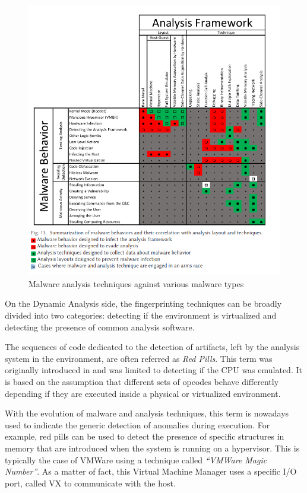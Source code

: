 \noindent
\begin{figure}[htp]
\centering
\includegraphics[width=\linewidth]{images/mal-fram.png}
\caption{Malware analysis techniques against various malware types}
\label{fig:mfrm}
\end{figure}

On the Dynamic Analysis side, the fingerprinting techniques can be broadly divided into two categories: detecting if the environment is virtualized and detecting the presence of common analysis software. 

The sequences of code dedicated to the detection of artifacts, left by the analysis system in the environment, are often referred as \textit{Red Pills}. This term was originally introduced in \cite{bruschi} and was limited to detecting if the CPU was emulated. It is based on the assumption that different sets of opcodes behave differently depending if they are executed inside a physical or virtualized environment. 

With the evolution of malware and analysis techniques, this term is nowadays used to indicate the generic detection of anomalies during execution. For example, red pills can be used to detect the presence of specific structures in memory that are introduced when the system is running on a hypervisor. This is typically the case of VMWare using a technique called \textit{“VMWare Magic Number”}. As a matter of fact, this Virtual Machine Manager uses a specific I/O port, called VX to communicate with the host. 

